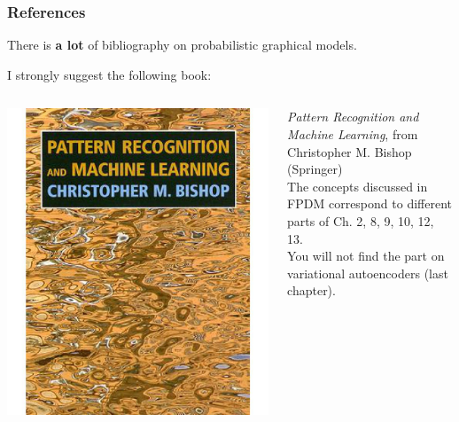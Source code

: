 \documentclass{beamer}
\begin{document}
\begin{frame} \frametitle{References}
There is \textbf{a lot} of bibliography on probabilistic graphical models.\vspace{0.3cm}

I strongly suggest the following book:\vspace{0.4cm}\\

\begin{columns}
  \begin{column}{0.3\textwidth}%
   \includegraphics[width=\textwidth]{fig/bishopbook.jpg}
  \end{column}%
  \begin{column}{0.6\textwidth}
    \textit{Pattern Recognition and Machine Learning}, from Christopher M. Bishop (Springer)\vspace{0.4cm}\\
    The concepts discussed in FPDM correspond to different parts of Ch. 2, 8, 9, 10, 12, 13.\vspace{0.4cm}\\
    You will not find the part on variational autoencoders (last chapter).
  \end{column}
 \end{columns} 
\end{frame}
\end{document}
